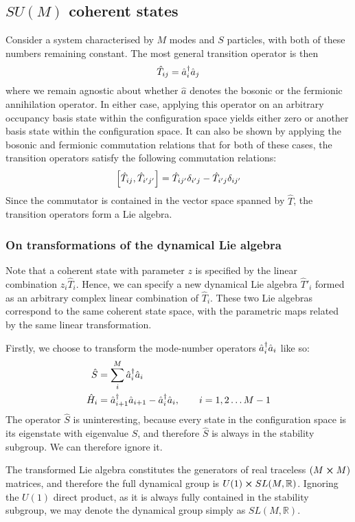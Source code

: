 \subsection{$SU(M)$ coherent states}
Consider a system characterised by $M$ modes and $S$ particles, with both of these numbers remaining constant. The most general transition operator is then
\begin{equation}
\hat{T}_{ij}=\hat{a}_i^\dagger\hat{a}_j
\end{equation}
where we remain agnostic about whether $\hat{a}$ denotes the bosonic or the fermionic annihilation operator. In either case, applying this operator on an arbitrary occupancy basis state within the configuration space yields either zero or another basis state within the configuration space. It can also be shown by applying the bosonic and fermionic commutation relations that for both of these cases, the transition operators satisfy the following commutation relations:
\begin{equation}
\comm{\hat{T}_{ij}}{\hat{T}_{i'j'}}=\hat{T}_{ij'}\delta_{i'j}-\hat{T}_{i'j}\delta_{ij'}
\end{equation}
Since the commutator is contained in the vector space spanned by $\hat{T}$, the transition operators form a Lie algebra.

\subsubsection{On transformations of the dynamical Lie algebra}
Note that a coherent state with parameter $z$ is specified by the linear combination $z_i\hat{T}_i$. Hence, we can specify a new dynamical Lie algebra $\hat{T}'_i$ formed as an arbitrary complex linear combination of $\hat{T}_i$. These two Lie algebras correspond to the same coherent state space, with the parametric maps related by the same linear transformation.

Firstly, we choose to transform the mode-number operators $\hat{a}_i^\dagger\hat{a}_i$ like so:
\begin{align}
\hat{S}&=\sum_i^M \hat{a}_i^\dagger\hat{a}_i\\
\hat{H}_i&=\hat{a}_{i+1}^\dagger\hat{a}_{i+1}-\hat{a}_i^\dagger\hat{a}_i,\qquad i=1,2\dots M-1
\end{align}
The operator $\hat{S}$ is uninteresting, because every state in the configuration space is its eigenstate with eigenvalue $S$, and therefore $\hat{S}$ is always in the stability subgroup. We can therefore ignore it.

The transformed Lie algebra constitutes the generators of real traceless $(M\cross M)$ matrices, and therefore the full dynamical group is $U(1)\cross SL(M,\mathbb{R})$. Ignoring the $U(1)$ direct product, as it is always fully contained in the stability subgroup, we may denote the dynamical group simply as $SL(M,\mathbb{R})$.

